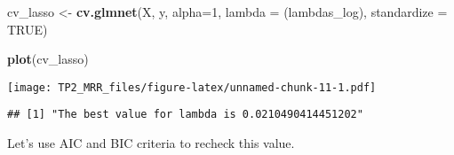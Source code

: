 \documentclass[
]{article}
\newenvironment{Shaded}{\begin{snugshade}}{\end{snugshade}}
\newcommand{\AttributeTok}[1]{\textcolor[rgb]{0.13,0.29,0.53}{#1}}
\newcommand{\CommentTok}[1]{\textcolor[rgb]{0.56,0.35,0.01}{\textit{#1}}}
\newcommand{\ConstantTok}[1]{\textcolor[rgb]{0.56,0.35,0.01}{#1}}
\newcommand{\DecValTok}[1]{\textcolor[rgb]{0.00,0.00,0.81}{#1}}
\newcommand{\FunctionTok}[1]{\textcolor[rgb]{0.13,0.29,0.53}{\textbf{#1}}}
\newcommand{\NormalTok}[1]{#1}
\newcommand{\OtherTok}[1]{\textcolor[rgb]{0.56,0.35,0.01}{#1}}
\newcommand{\SpecialCharTok}[1]{\textcolor[rgb]{0.81,0.36,0.00}{\textbf{#1}}}
\newcommand{\StringTok}[1]{\textcolor[rgb]{0.31,0.60,0.02}{#1}}
\begin{document}
\begin{Shaded}
\begin{Highlighting}[]
\NormalTok{cv\_lasso }\OtherTok{\textless{}{-}} \FunctionTok{cv.glmnet}\NormalTok{(X, y, }\AttributeTok{alpha=}\DecValTok{1}\NormalTok{, }\AttributeTok{lambda =}\NormalTok{ (lambdas\_log), }\AttributeTok{standardize =} \ConstantTok{TRUE}\NormalTok{)}

\FunctionTok{plot}\NormalTok{(cv\_lasso)}
\end{Highlighting}
\end{Shaded}

\texttt{[image: TP2\_MRR\_files/figure-latex/unnamed-chunk-11-1.pdf]}

\begin{Shaded}
\end{Shaded}

\begin{verbatim}
## [1] "The best value for lambda is 0.0210490414451202"
\end{verbatim}

Let's use AIC and BIC criteria to recheck this value.
\end{document}
